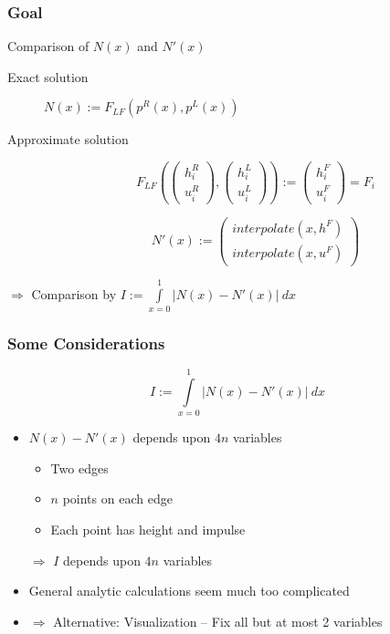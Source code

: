 \documentclass{beamer}
\begin{document}
\begin{frame}
  \frametitle{Goal}
  \begin{block}{Comparison of $N(x)$ and $N'(x)$}
    \begin{description}
    \item[Exact solution] $N(x) := F_{LF}(p^R(x),p^L(x))$
    \item[Approximate solution] 
      \begin{equation*}
        F_{LF}\left(
          \begin{pmatrix}
            h_i^R \\ u_i^R
          \end{pmatrix},
          \begin{pmatrix}
            h_i^L \\ u_i^L
          \end{pmatrix}
        \right) :=
        \begin{pmatrix}
          h_i^F \\ u_i^F
        \end{pmatrix} = F_i
      \end{equation*}

      \begin{equation*}
        N'(x) :=
        \begin{pmatrix}
          interpolate(x,h^F) \\ interpolate(x,u^F)
        \end{pmatrix}
      \end{equation*}
    \end{description}
  \end{block}
  $\Rightarrow$ Comparison by 
  $I := \int\limits_{x=0}^1 | N(x) - N'(x) |\  dx$
\end{frame}

\begin{frame}
  \frametitle{Some Considerations}
  \begin{equation*}
    I := \int\limits_{x=0}^1 | N(x) - N'(x) |\ dx
  \end{equation*}
  \begin{itemize}
  \item $N(x)-N'(x)$ depends upon $4n$ variables
    \begin{itemize}
    \item Two edges
    \item $n$ points on each edge
    \item Each point has height and impulse
    \end{itemize}
  
    $\Rightarrow$ $I$ depends upon $4n$ variables
  \item General analytic calculations seem much too complicated
  \item $\Rightarrow$ Alternative: Visualization -- Fix all but at most 2 variables
  \end{itemize}
\end{frame}
\end{document}
